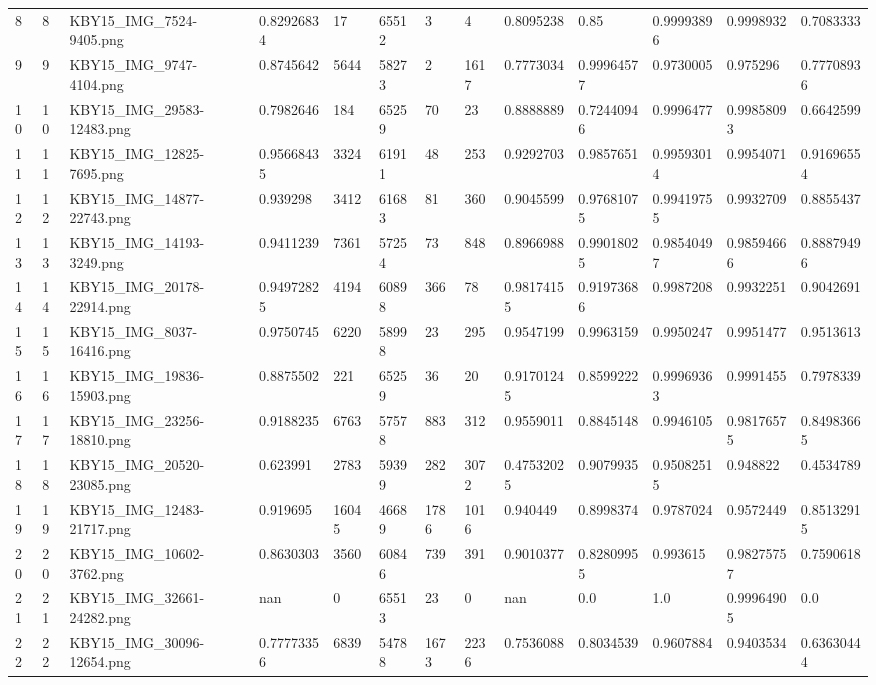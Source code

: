 \documentclass[11pt, a4paper, twoside]{report}
\begin{document}
\begin{longtable}[c]{@{}lllllllllllll@{}}
8 & 8 & KBY15\_IMG\_7524-9405.png & 0.82926834 & 17 & 65512 & 3 & 4 & 0.8095238 & 0.85 & 0.99993896 & 0.9998932 & 0.7083333 \\
9 & 9 & KBY15\_IMG\_9747-4104.png & 0.8745642 & 5644 & 58273 & 2 & 1617 & 0.7773034 & 0.99964577 & 0.9730005 & 0.975296 & 0.77708936 \\
10 & 10 & KBY15\_IMG\_29583-12483.png & 0.7982646 & 184 & 65259 & 70 & 23 & 0.8888889 & 0.72440946 & 0.9996477 & 0.99858093 & 0.6642599 \\
11 & 11 & KBY15\_IMG\_12825-7695.png & 0.95668435 & 3324 & 61911 & 48 & 253 & 0.9292703 & 0.9857651 & 0.99593014 & 0.9954071 & 0.91696554 \\
12 & 12 & KBY15\_IMG\_14877-22743.png & 0.939298 & 3412 & 61683 & 81 & 360 & 0.9045599 & 0.97681075 & 0.99419755 & 0.9932709 & 0.8855437 \\
13 & 13 & KBY15\_IMG\_14193-3249.png & 0.9411239 & 7361 & 57254 & 73 & 848 & 0.8966988 & 0.99018025 & 0.98540497 & 0.98594666 & 0.88879496 \\
14 & 14 & KBY15\_IMG\_20178-22914.png & 0.94972825 & 4194 & 60898 & 366 & 78 & 0.98174155 & 0.91973686 & 0.9987208 & 0.9932251 & 0.9042691 \\
15 & 15 & KBY15\_IMG\_8037-16416.png & 0.9750745 & 6220 & 58998 & 23 & 295 & 0.9547199 & 0.9963159 & 0.9950247 & 0.9951477 & 0.9513613 \\
16 & 16 & KBY15\_IMG\_19836-15903.png & 0.8875502 & 221 & 65259 & 36 & 20 & 0.91701245 & 0.8599222 & 0.99969363 & 0.9991455 & 0.7978339 \\
17 & 17 & KBY15\_IMG\_23256-18810.png & 0.9188235 & 6763 & 57578 & 883 & 312 & 0.9559011 & 0.8845148 & 0.9946105 & 0.98176575 & 0.84983665 \\
18 & 18 & KBY15\_IMG\_20520-23085.png & 0.623991 & 2783 & 59399 & 282 & 3072 & 0.47532025 & 0.9079935 & 0.95082515 & 0.948822 & 0.4534789 \\
19 & 19 & KBY15\_IMG\_12483-21717.png & 0.919695 & 16045 & 46689 & 1786 & 1016 & 0.940449 & 0.8998374 & 0.9787024 & 0.9572449 & 0.85132915 \\
20 & 20 & KBY15\_IMG\_10602-3762.png & 0.8630303 & 3560 & 60846 & 739 & 391 & 0.9010377 & 0.82809955 & 0.993615 & 0.98275757 & 0.7590618 \\
21 & 21 & KBY15\_IMG\_32661-24282.png & nan & 0 & 65513 & 23 & 0 & nan & 0.0 & 1.0 & 0.99964905 & 0.0 \\
22 & 22 & KBY15\_IMG\_30096-12654.png & 0.77773356 & 6839 & 54788 & 1673 & 2236 & 0.7536088 & 0.8034539 & 0.9607884 & 0.9403534 & 0.63630444 \\

\end{longtable}
\end{document}
